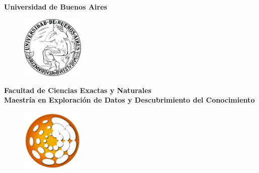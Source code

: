 \documentclass[runningheads,a4paper]{llncs}
\begin{document}
\mainmatter  %


\begin{titlepage}

\begin{center}
    
\textbf{\LARGE{Universidad de Buenos Aires}}
\end{center}
\vspace*{0.15in}


\begin{figure}[htb]
\begin{center}
\includegraphics[width=3cm]{../logos/UBAlogo.png}
\end{center}
\end{figure}

\begin{center}
\Large{\textbf{Facultad de Ciencias Exactas y Naturales}}\\
\vspace*{0.1in}
\large{\textbf{Maestría en Exploración de Datos y Descubrimiento del Conocimiento}} \\
\vspace*{0.1in}

\begin{figure}[htb]
\begin{center}
\includegraphics[width=3cm]{../logos/dmlogo.png}
\end{center}
\end{figure}


\end{center}
\end{titlepage}
\end{document}

